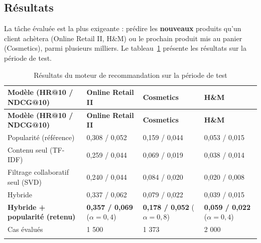\subsection{Résultats}
La tâche évaluée est la plus exigeante : prédire les \textbf{nouveaux} produits qu'un client achètera (Online Retail II, H\&M) ou le prochain produit mis au panier (Cosmetics), parmi plusieurs milliers. Le tableau~\ref{tab:resultats-reco} présente les résultats sur la période de test.

\renewcommand{\arraystretch}{1.3}
\begin{longtable}{|p{5.2cm}|p{2.9cm}|p{2.9cm}|p{2.9cm}|}
\hline
\textbf{Modèle (HR@10 / NDCG@10)} & \textbf{Online Retail II} & \textbf{Cosmetics} & \textbf{H\&M} \\
\hline
\endfirsthead
\hline
\textbf{Modèle (HR@10 / NDCG@10)} & \textbf{Online Retail II} & \textbf{Cosmetics} & \textbf{H\&M} \\
\hline
\endhead
Popularité (référence) & 0,308 / 0,052 & 0,159 / 0,044 & 0,053 / 0,015 \\
\hline
Contenu seul (TF-IDF) & 0,259 / 0,044 & 0,069 / 0,019 & 0,038 / 0,014 \\
\hline
Filtrage collaboratif seul (SVD) & 0,240 / 0,044 & 0,084 / 0,020 & 0,020 / 0,008 \\
\hline
Hybride & 0,337 / 0,062 & 0,079 / 0,022 & 0,039 / 0,015 \\
\hline
\textbf{Hybride + popularité (retenu)} & \textbf{0,357 / 0,069} ($\alpha=0{,}4$) & \textbf{0,178 / 0,052} ($\alpha=0{,}8$) & \textbf{0,059 / 0,022} ($\alpha=0{,}4$) \\
\hline
Cas évalués & 1 500 & 1 373 & 2 000 \\
\hline
\caption{Résultats du moteur de recommandation sur la période de test}
\label{tab:resultats-reco}
\end{longtable}

